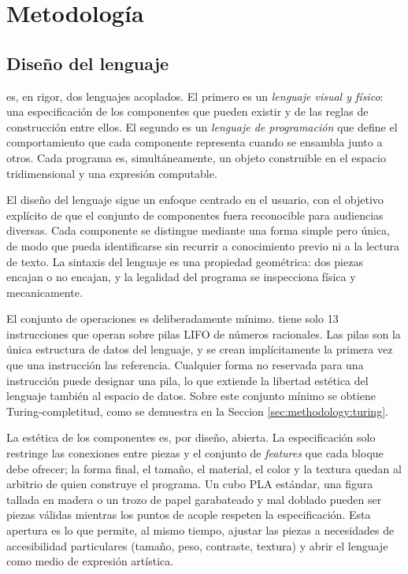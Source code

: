 
\section{Metodolog\'ia}
\label{sec:methodology}

\subsection{Dise\~no del lenguaje}
\label{sec:methodology:design}

\sculpt es, en rigor, dos lenguajes acoplados. El primero es un
\emph{lenguaje visual y f\'isico}: una especificaci\'on de los
componentes que pueden existir y de las reglas de construcci\'on entre ellos.
El segundo es un \emph{lenguaje de programaci\'on} que define el
comportamiento que cada componente representa cuando se ensambla
junto a otros. Cada programa \sculpt es, simult\'aneamente, un objeto
construible en el espacio tridimensional y una expresi\'on computable.

El dise\~no del lenguaje sigue un enfoque centrado en el usuario,
con el objetivo expl\'icito de que el conjunto de componentes fuera
reconocible para audiencias diversas. Cada componente se distingue
mediante una forma simple pero \'unica, de modo que pueda
identificarse sin recurrir a conocimiento previo ni a la lectura de
texto. La sintaxis del lenguaje es una propiedad
geom\'etrica: dos piezas encajan o no encajan, y la legalidad del
programa se inspecciona f\'isica y mecanicamente.

El conjunto de operaciones es deliberadamente m\'inimo. \sculpt tiene
solo 13 instrucciones que operan sobre pilas LIFO de n\'umeros
racionales. Las pilas son la \'unica estructura de datos del lenguaje,
y se crean impl\'icitamente la primera vez que una instrucci\'on las
referencia. Cualquier forma no reservada para una instrucci\'on puede
designar una pila, lo que extiende la libertad est\'etica del lenguaje
tambi\'en al espacio de datos. Sobre este conjunto m\'inimo se obtiene
Turing-completitud, como se demuestra en la Seccion \ref{sec:methodology:turing}.

La est\'etica de los componentes es, por dise\~no, abierta. La
especificaci\'on solo restringe las conexiones entre piezas y el
conjunto de \emph{features} que cada bloque debe ofrecer; la forma
final, el tama\~no, el material, el color y la textura quedan al
arbitrio de quien construye el programa. Un cubo PLA est\'andar, una
figura tallada en madera o un trozo de papel garabateado y mal doblado
pueden ser piezas v\'alidas mientras los puntos de
acople respeten la especificaci\'on. Esta apertura es lo que permite,
al mismo tiempo, ajustar las piezas a necesidades de accesibilidad
particulares (tama\~no, peso, contraste, textura) y abrir el lenguaje
como medio de expresi\'on art\'istica.

